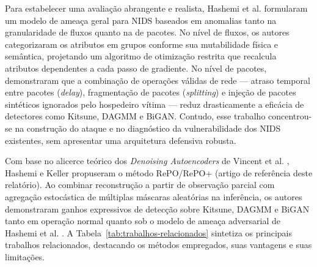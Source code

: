 \documentclass[conference]{IEEEtran}
\begin{document}
Para estabelecer uma avaliação abrangente e realista, Hashemi et al. \cite{hashemi2019} formularam um modelo de ameaça geral para NIDS baseados em anomalias tanto na granularidade de fluxos quanto na de pacotes.
No nível de fluxos, os autores categorizaram os atributos em grupos conforme sua mutabilidade física e semântica, projetando um algoritmo de otimização restrita que recalcula atributos dependentes a cada passo de gradiente.
No nível de pacotes, demonstraram que a combinação de operações válidas de rede — atraso temporal entre pacotes (\textit{delay}), fragmentação de pacotes (\textit{splitting}) e injeção de pacotes sintéticos ignorados pelo hospedeiro vítima — reduz drasticamente a eficácia de detectores como Kitsune, DAGMM e BiGAN.
Contudo, esse trabalho concentrou-se na construção do ataque e no diagnóstico da vulnerabilidade dos NIDS existentes, sem apresentar uma arquitetura defensiva robusta.

Com base no alicerce teórico dos \textit{Denoising Autoencoders} de Vincent et al. \cite{vincent2008}, Hashemi e Keller \cite{hashemi2020} propuseram o método RePO/RePO+ (artigo de referência deste relatório).
Ao combinar reconstrução a partir de observação parcial com agregação estocástica de múltiplas máscaras aleatórias na inferência, os autores demonstraram ganhos expressivos de detecção sobre Kitsune, DAGMM e BiGAN tanto em operação normal quanto sob o modelo de ameaça adversarial de Hashemi et al. \cite{hashemi2019}.
A Tabela~\ref{tab:trabalhos-relacionados} sintetiza os principais trabalhos relacionados, destacando os métodos empregados, suas vantagens e suas limitações.
\end{document}
